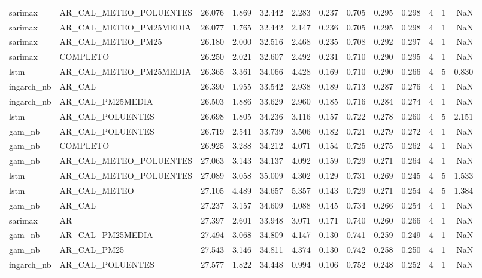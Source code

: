 \begin{tabular}{llrrrrrrrrrrr}
sarimax & AR_CAL_METEO_POLUENTES & 26.076 & 1.869 & 32.442 & 2.283 & 0.237 & 0.705 & 0.295 & 0.298 & 4 & 1 & NaN \\
sarimax & AR_CAL_METEO_PM25MEDIA & 26.077 & 1.765 & 32.442 & 2.147 & 0.236 & 0.705 & 0.295 & 0.298 & 4 & 1 & NaN \\
sarimax & AR_CAL_METEO_PM25 & 26.180 & 2.000 & 32.516 & 2.468 & 0.235 & 0.708 & 0.292 & 0.297 & 4 & 1 & NaN \\
sarimax & COMPLETO & 26.250 & 2.021 & 32.607 & 2.492 & 0.231 & 0.710 & 0.290 & 0.295 & 4 & 1 & NaN \\
lstm & AR_CAL_METEO_PM25MEDIA & 26.365 & 3.361 & 34.066 & 4.428 & 0.169 & 0.710 & 0.290 & 0.266 & 4 & 5 & 0.830 \\
ingarch_nb & AR_CAL & 26.390 & 1.955 & 33.542 & 2.938 & 0.189 & 0.713 & 0.287 & 0.276 & 4 & 1 & NaN \\
ingarch_nb & AR_CAL_PM25MEDIA & 26.503 & 1.886 & 33.629 & 2.960 & 0.185 & 0.716 & 0.284 & 0.274 & 4 & 1 & NaN \\
lstm & AR_CAL_POLUENTES & 26.698 & 1.805 & 34.236 & 3.116 & 0.157 & 0.722 & 0.278 & 0.260 & 4 & 5 & 2.151 \\
gam_nb & AR_CAL_POLUENTES & 26.719 & 2.541 & 33.739 & 3.506 & 0.182 & 0.721 & 0.279 & 0.272 & 4 & 1 & NaN \\
gam_nb & COMPLETO & 26.925 & 3.288 & 34.212 & 4.071 & 0.154 & 0.725 & 0.275 & 0.262 & 4 & 1 & NaN \\
gam_nb & AR_CAL_METEO_POLUENTES & 27.063 & 3.143 & 34.137 & 4.092 & 0.159 & 0.729 & 0.271 & 0.264 & 4 & 1 & NaN \\
lstm & AR_CAL_METEO_POLUENTES & 27.089 & 3.058 & 35.009 & 4.302 & 0.129 & 0.731 & 0.269 & 0.245 & 4 & 5 & 1.533 \\
lstm & AR_CAL_METEO & 27.105 & 4.489 & 34.657 & 5.357 & 0.143 & 0.729 & 0.271 & 0.254 & 4 & 5 & 1.384 \\
gam_nb & AR_CAL & 27.237 & 3.157 & 34.609 & 4.088 & 0.145 & 0.734 & 0.266 & 0.254 & 4 & 1 & NaN \\
sarimax & AR & 27.397 & 2.601 & 33.948 & 3.071 & 0.171 & 0.740 & 0.260 & 0.266 & 4 & 1 & NaN \\
gam_nb & AR_CAL_PM25MEDIA & 27.494 & 3.068 & 34.809 & 4.147 & 0.130 & 0.741 & 0.259 & 0.249 & 4 & 1 & NaN \\
gam_nb & AR_CAL_PM25 & 27.543 & 3.146 & 34.811 & 4.374 & 0.130 & 0.742 & 0.258 & 0.250 & 4 & 1 & NaN \\
ingarch_nb & AR_CAL_POLUENTES & 27.577 & 1.822 & 34.448 & 0.994 & 0.106 & 0.752 & 0.248 & 0.252 & 4 & 1 & NaN \\

\end{tabular}
